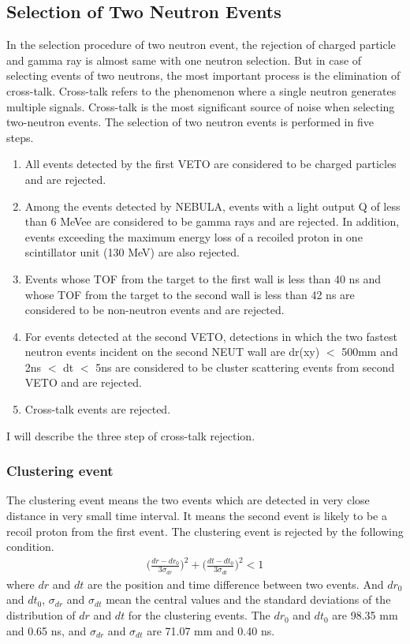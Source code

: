 \subsection {Selection of Two Neutron Events}
In the selection procedure of two neutron event, the rejection of charged particle and gamma ray is almost same with one neutron selection. But in case of selecting events of two neutrons, the most important process is the elimination of cross-talk. Cross-talk refers to the phenomenon where a single neutron generates multiple signals. Cross-talk is the most significant source of noise when selecting two-neutron events. The selection of two neutron events is performed in five steps. 
\begin{enumerate}
    \item All events detected by the first VETO are considered to be charged particles and are rejected.
    \item Among the events detected by NEBULA, events with a light output Q of less than 6 MeVee are considered to be gamma rays and are rejected. In addition, events exceeding the maximum energy loss of a recoiled proton in one scintillator unit (130 MeV) are also rejected.
    \item Events whose TOF from the target to the first wall is less than 40 ns and whose TOF from the target to the second wall is less than 42 ns are considered to be non-neutron events and are rejected.
    \item For events detected at the second VETO, detections in which the two fastest neutron events incident on the second NEUT wall are dr(xy) $<$ 500mm and 2ns $<$ dt $<$ 5ns are considered to be cluster scattering events from second VETO and are rejected.
    \item Cross-talk events are rejected.
\end{enumerate}
I will describe the three step of cross-talk rejection.

\subsubsection{Clustering event}
The clustering event means the two events which are detected in very close distance in very small time interval. It means the second event is likely to be a recoil proton from the first event. The clustering event is rejected by the following condition.
\begin{align}
    \bigg( \frac{dr-dr_0}{3\sigma_{dr}} \bigg)^2 + \bigg( \frac{dt-dt_0}{3\sigma_{dt}} \bigg)^2 < 1 
\end{align}
where $dr$ and $dt$ are the position and time difference between two events. And $dr_0$ and $dt_0$, $\sigma_{dr}$ and $\sigma_{dt}$ mean the central values and the standard deviations of the distribution of $dr$ and $dt$ for the clustering events. The $dr_0$ and $dt_0$ are 98.35 mm and 0.65 ns, and $\sigma_{dr}$ and $\sigma_{dt}$ are 71.07 mm and 0.40 ns. 

